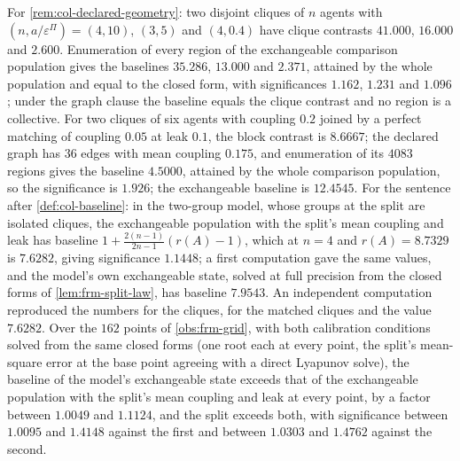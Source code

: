 \begin{numcheck}\label{chk:col-declared}
For \cref{rem:col-declared-geometry}: two disjoint cliques of $n$ agents with $(n,a/\varepsilon^\Pi)=(4,10)$, $(3,5)$ and $(4,0.4)$ have clique contrasts $41.000$, $16.000$ and $2.600$. Enumeration of every region of the exchangeable comparison population gives the baselines $35.286$, $13.000$ and $2.371$, attained by the whole population and equal to the closed form, with significances $1.162$, $1.231$ and $1.096$; under the graph clause the baseline equals the clique contrast and no region is a collective. For two cliques of six agents with coupling $0.2$ joined by a perfect matching of coupling $0.05$ at leak $0.1$, the block contrast is $8.6667$; the declared graph has $36$ edges with mean coupling $0.175$, and enumeration of its $4083$ regions gives the baseline $4.5000$, attained by the whole comparison population, so the significance is $1.926$; the exchangeable baseline is $12.4545$. For the sentence after \cref{def:col-baseline}: in the two-group model, whose groups at the split are isolated cliques, the exchangeable population with the split's mean coupling and leak has baseline $1+\frac{2(n-1)}{2n-1}(r(A)-1)$, which at $n=4$ and $r(A)=8.7329$ is $7.6282$, giving significance $1.1448$; a first computation gave the same values, and the model's own exchangeable state, solved at full precision from the closed forms of \cref{lem:frm-split-law}, has baseline $7.9543$. An independent computation reproduced the numbers for the cliques, for the matched cliques and the value $7.6282$. Over the $162$ points of \cref{obs:frm-grid}, with both calibration conditions solved from the same closed forms (one root each at every point, the split's mean-square error at the base point agreeing with a direct Lyapunov solve), the baseline of the model's exchangeable state exceeds that of the exchangeable population with the split's mean coupling and leak at every point, by a factor between $1.0049$ and $1.1124$, and the split exceeds both, with significance between $1.0095$ and $1.4148$ against the first and between $1.0303$ and $1.4762$ against the second.
\end{numcheck}


